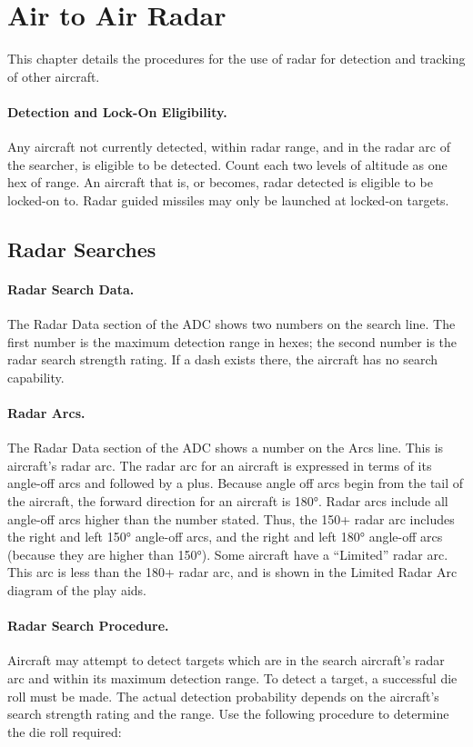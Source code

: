 \section{Air to Air Radar}

This chapter details the procedures for the use of radar for detection and tracking of other aircraft.

\paragraph{Detection and Lock-On Eligibility.} Any aircraft not currently detected, within radar range, and in the radar arc of the searcher, is eligible to be detected. Count each two levels of altitude as one hex of range. An aircraft that is, or becomes, radar detected is eligible to be locked-on to. Radar guided missiles may only be launched at locked-on targets.

\subsection{Radar Searches}

\paragraph{Radar Search Data.} The Radar Data section of the ADC shows two numbers on the search line. The first number is the maximum detection range in hexes; the second number is the radar search strength rating. If a dash exists there, the aircraft has no search capability.

\paragraph{Radar Arcs.} The Radar Data section of the ADC shows a number on the Arcs line. This is aircraft's radar arc. The radar arc for an aircraft is expressed in terms of its angle-off arcs and followed by a plus. Because angle off arcs begin from the tail of the aircraft, the forward direction for an aircraft is 180°.  Radar arcs include all angle-off arcs higher than the number stated. Thus, the 150+ radar arc includes the right and left 150° angle-off arcs, and the right and left 180° angle-off arcs (because they are higher than 150°). Some aircraft have a “Limited” radar arc. This arc is less than the 180+ radar arc, and is shown in the Limited Radar Arc diagram of the play aids.

\paragraph{Radar Search Procedure.} Aircraft may attempt to detect targets which are in the search aircraft's radar arc and within its maximum detection range. To detect a target, a successful die roll must be made. The actual detection probability depends on the aircraft's search strength rating and the range. Use the following procedure to determine the die roll required:

